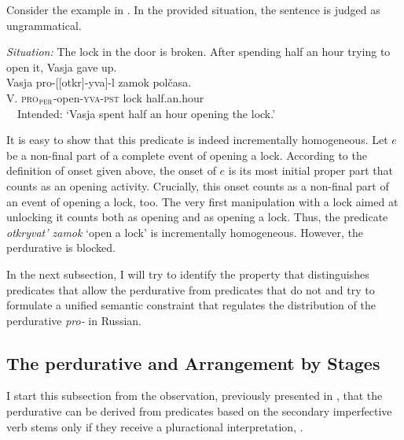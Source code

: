 \documentclass[output=paper,
]{langscibook}
\begin{document}
Consider the example in . In the provided situation, the sentence is judged as ungrammatical.

\ea \label{ex:naumov:32} \textit{Situation:} The lock in the door is broken. After spending half an hour trying to open it, Vasja gave up.\smallskip\\ 
\gll * Vasja		pro-[[otkr]-yva]-l		zamok		polčasa.\\  
    {} V.		\textsc{pro}$_\textsc{per}$-open-\textsc{yva}-\textsc{pst}	lock		half.an.hour\\ 
\glt \ \ Intended: `Vasja spent half an hour opening the lock.'
\z

\noindent It is easy to show that this predicate is indeed incrementally homogeneous. Let $e$ be a non-final part of a complete event of opening a lock. According to the definition of onset given above, the onset of $e$ is its most initial proper part that counts as an opening activity. Crucially, this onset counts as a non-final part of an event of opening a lock, too. The very first manipulation with a lock aimed at unlocking it counts both as opening and as opening a lock. Thus, the predicate \textit{otkryvat’ zamok} `open a lock’ is incrementally homogeneous. However, the perdurative is blocked.

In the next subsection, I will try to identify the property that distinguishes predicates that allow the perdurative from predicates that do not and try to formulate a unified semantic constraint that regulates the distribution of the perdurative \textit{pro-} in Russian.

\subsection{The perdurative and Arrangement by Stages} \label{sec:naumov:3.5}

I start this subsection from the observation, previously presented in , that the perdurative can be derived from predicates based on the secondary imperfective verb stems only if they receive a pluractional interpretation, .

\z 
\end{document}
